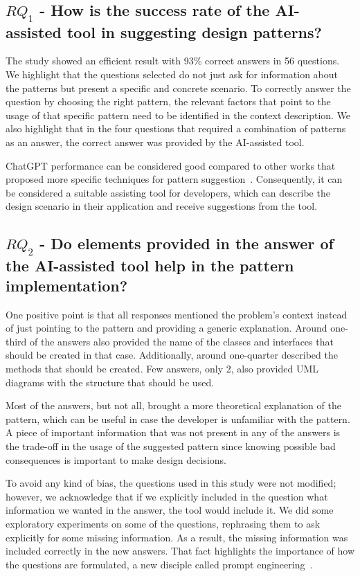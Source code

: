 \documentclass[runningheads]{llncs}
\begin{document}
\subsection{$RQ_1$ - How is the success rate of the AI-assisted tool in suggesting design patterns?}\label{sec5sub1}

The study showed an efficient result with 93\% correct answers in 56 questions. We highlight that the questions selected do not just ask for information about the patterns but present a specific and concrete scenario. To correctly answer the question by choosing the right pattern, the relevant factors that point to the usage of that specific pattern need to be identified in the context description. We also highlight that in the four questions that required a combination of patterns as an answer, the correct answer was provided by the AI-assisted tool. 

ChatGPT performance can be considered good compared to other works that proposed more specific techniques for pattern suggestion~\cite{HUSSAIN20191,HASHEMINEJAD2012408}. Consequently, it can be considered a suitable assisting tool for developers, which can describe the design scenario in their application and receive suggestions from the tool.

\subsection{$RQ_2$ - Do elements provided in the answer of the AI-assisted tool help in the pattern implementation?}\label{sec5sub2}

One positive point is that all responses mentioned the problem's context instead of just pointing to the pattern and providing a generic explanation. Around one-third of the answers also provided the name of the classes and interfaces that should be created in that case. Additionally, around one-quarter described the methods that should be created. Few answers, only 2, also provided UML diagrams with the structure that should be used.

Most of the answers, but not all, brought a more theoretical explanation of the pattern, which can be useful in case the developer is unfamiliar with the pattern. A piece of important information that was not present in any of the answers is the trade-off in the usage of the suggested pattern since knowing possible bad consequences is important to make design decisions.

To avoid any kind of bias, the questions used in this study were not modified; however, we acknowledge that if we explicitly included in the question what information we wanted in the answer, the tool would include it. We did some exploratory experiments on some of the questions, rephrasing them to ask explicitly for some missing information. As a result, the missing information was included correctly in the new answers. That fact highlights the importance of how the questions are formulated, a new disciple called prompt engineering~\cite{white2023chatgpt}.  
\end{document}
